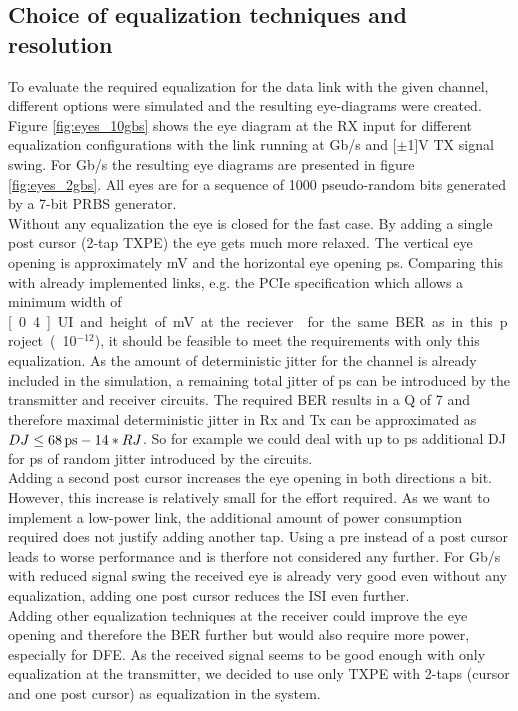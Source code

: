 \subsection{Choice of equalization techniques and resolution} 
\label{ch:equalization_choice}

To evaluate the required equalization for the data link with the given channel, different options were simulated and the resulting eye-diagrams were created. \\
Figure \ref{fig:eyes_10gbs} shows the eye diagram at the RX input for different equalization configurations with the link running at \unit[10]{Gb/s} and \unit[$\pm$1]{V} TX signal swing. For \unit[2]{Gb/s} the resulting eye diagrams are presented in figure \ref{fig:eyes_2gbs}. All eyes are for a sequence of 1000 pseudo-random bits generated by a 7-bit PRBS generator.\\
Without any equalization the eye is closed for the fast case. By adding a single post cursor (2-tap TXPE) the eye gets much more relaxed. The vertical eye opening is approximately \unit[360]{mV} and the horizontal eye opening \unit[68]{ps}. Comparing this with already implemented links, e.g. the PCIe specification which allows a minimum width of \unit[0.4]{UI} and height of \unit[120]{mV} at the reciever \cite{pcie_spec} for the same BER as in this project (10$^{-12}$), it should be feasible to meet the requirements with only this equalization. As the amount of deterministic jitter for the channel is already included in the simulation, a remaining total jitter of \unit[68]{ps} can be introduced by the transmitter and receiver circuits. The required BER results in a Q of 7 and therefore maximal deterministic jitter in Rx and Tx can be approximated as $DJ\leq\unit[68]{ps}-14*RJ$. So for example we could deal with up to \unit[26]{ps} additional DJ for \unit[3]{ps} of random jitter introduced by the circuits.\\
Adding a second post cursor increases the eye opening in both directions a bit. However, this increase is relatively small for the effort required. As we want to implement a low-power link, the additional amount of power consumption required does not justify adding another tap. Using a pre instead of a post cursor leads to worse performance and is therfore not considered any further. For \unit[2]{Gb/s} with reduced signal swing the received eye is already very good even without any equalization, adding one post cursor reduces the ISI even further.\\
Adding other equalization techniques at the receiver could improve the eye opening and therefore the BER further but would also require more power, especially for DFE. As the received signal seems to be good enough with only equalization at the transmitter, we decided to use only TXPE with 2-taps (cursor and one post cursor) as equalization in the system.


